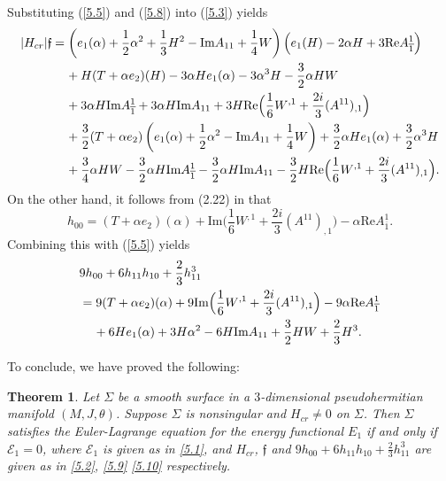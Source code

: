 \documentclass{amsart}
\newtheorem{theorem}{Theorem}[section]
\theoremstyle{Corollary}
\numberwithin{equation}{section}
\begin{document}
Substituting  (\ref{5.5}) and (\ref{5.8}) into (\ref{5.3}) yields
\begin{equation}\label{5.9}
\begin{split}
|H_{cr}|\mathfrak{f}
&=\left(e_1(\alpha)+\frac{1}{2}\alpha^2+\frac{1}{3}H^2-\mbox{Im} A_{11}+\frac{1}{4}W\right)\Big(e_1(H)-2\alpha H+3 \mbox{Re} A^1_{\overline{1}}\Big)\\
&\hspace{4mm}
+H(T+\alpha e_2)(H)-3\alpha He_1(\alpha)-3\alpha^3H-\frac{3}{2}\alpha HW\\
&\hspace{4mm}+3\alpha H \mbox{Im} A^1_{\overline{1}}+3\alpha H \mbox{Im} A_{11}
+3H
\mbox{Re}\Big(\frac{1}{6}W^{,1}+\frac{2i}{3}(A^{11})_{,1}\Big)\\
&\hspace{4mm}
+\frac{3}{2}(T+\alpha e_2)\left(e_1(\alpha)+\frac{1}{2}\alpha^2-\mbox{Im} A_{11}+\frac{1}{4}W\right)+\frac{3}{2}\alpha H e_1(\alpha)+\frac{3}{2}\alpha^3 H\\
&\hspace{4mm}+\frac{3}{4}\alpha HW-\frac{3}{2}\alpha H \mbox{Im} A^1_{\overline{1}}-\frac{3}{2}\alpha H \mbox{Im}A_{11}
-\frac{3}{2}H\mbox{Re}\Big(\frac{1}{6}W^{,1}+\frac{2i}{3}(A^{11})_{,1}\Big).
\end{split}
\end{equation}
On the other hand, it follows from (2.22) in \cite{CYZ} that 
$$h_{00}=(T+\alpha e_2)(\alpha)
+\mbox{Im}\Big(\frac{1}{6}W^{,1}+\frac{2i}{3}(A^{11})_{,1}\Big)-\alpha \mbox{Re} A^1_{\overline{1}}.$$
Combining this with (\ref{5.5}) yields 
\begin{equation}\label{5.10}
\begin{split}
&9h_{00}+6h_{11}h_{10}+\frac{2}{3}h_{11}^3\\
&=9(T+\alpha e_2)(\alpha)
+9\mbox{Im}\Big(\frac{1}{6}W^{,1}+\frac{2i}{3}(A^{11})_{,1}\Big)-9\alpha \mbox{Re} A^1_{\overline{1}}\\
&\hspace{4mm}+6He_1(\alpha)+3H\alpha^2-6H\mbox{Im} A_{11}+\frac{3}{2}HW+\frac{2}{3}H^3.
\end{split}
\end{equation}

To conclude, we have proved the following: 
\begin{theorem}\label{thm5.1}
Let $\Sigma$ be a smooth surface in a $3$-dimensional 
pseudohermitian manifold $(M,J,\theta)$. 
Suppose $\Sigma$ is nonsingular and $H_{cr}\neq 0$ on $\Sigma$. 
Then $\Sigma$ satisfies the Euler-Lagrange equation 
for the energy functional $E_1$
if and only if $\mathcal{E}_1=0$, 
where $\mathcal{E}_1$ is given as in 
\eqref{5.1}, 
and 
$H_{cr}$, $\mathfrak{f}$
and $9h_{00}+6h_{11}h_{10}+\frac{2}{3}h_{11}^3$ 
are given as in \eqref{5.2}, \eqref{5.9}
\eqref{5.10} respectively. 
\end{theorem}
\end{document}
